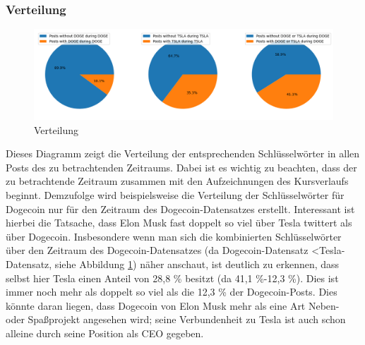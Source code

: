 \documentclass{article}
\begin{document}
\subsubsection{Verteilung} \label{Verteilung}
\begin{figure}[h]
  	\centering
  	\includegraphics[width=\textwidth]{../imgs/Verteilung.png}
 	\caption{Verteilung}
 	\label{fig:Verteilung}
\end{figure}
Dieses Diagramm zeigt die Verteilung der entsprechenden Schlüsselwörter in allen Posts des zu betrachtenden Zeitraums.
Dabei ist es wichtig zu beachten, dass der zu betrachtende Zeitraum zusammen mit den Aufzeichnungen des Kursverlaufs beginnt.
Demzufolge wird beispielsweise die Verteilung der Schlüsselwörter für Dogecoin nur für den Zeitraum des Dogecoin-Datensatzes erstellt.
Interessant ist hierbei die Tatsache, dass Elon Musk fast doppelt so viel über Tesla twittert als über Dogecoin.
Insbesondere wenn man sich die kombinierten Schlüsselwörter über den Zeitraum des Dogecoin-Datensatzes (da Dogecoin-Datensatz \textless Tesla-Datensatz, siehe Abbildung \ref{fig:Verteilung}) näher anschaut, ist deutlich zu erkennen, dass selbst hier Tesla einen Anteil von 28,8 \% besitzt (da 41,1 \%-12,3 \%).
Dies ist immer noch mehr als doppelt so viel als die 12,3 \% der Dogecoin-Posts.
Dies könnte daran liegen, dass Dogecoin von Elon Musk mehr als eine Art Neben- oder Spaßprojekt angesehen wird; seine Verbundenheit zu Tesla ist auch schon alleine durch seine Position als CEO gegeben.
\end{document}
